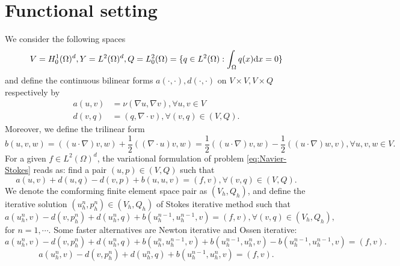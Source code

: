 \section{Functional setting}
We consider the following spaces
\[V=H_0^1(\Omega)^d,Y=L^2(\Omega)^d,Q=L^2_0(\Omega)=\{q\in L^2(\Omega):\int_\Omega q(x)\mathrm{d} x=0\}\]
and define the continuous bilinear forms $a(\cdot,\cdot),d(\cdot,\cdot)$ on $V\times V,V\times Q$ 
respectively by
\[
  \begin{split}
    a(u,v)&=\nu(\nabla u,\nabla v),\forall u,v\in V\\
    d(v,q)&=(q,\nabla\cdot v),\forall (v,q)\in(V,Q).
  \end{split}
  \]
Moreover, we define the trilinear form
\[b(u,v,w)=((u\cdot\nabla)v,w)+\frac{1}{2}((\nabla\cdot u)v,w)=
\frac{1}{2}((u\cdot\nabla)v,w)-\frac{1}{2}((u\cdot\nabla)w,v),\forall u,v,w\in V.\]
For a given $f\in L^2(\Omega)^d$, the variational formulation of problem \eqref{eq:Navier-Stokes} reads as: 
find a pair $(u,p)\in(V,Q)$ such that 
\begin{equation}\label{eq:variational-form}
  a(u,v)+d(u,q)-d(v,p)+b(u,u,v)=(f,v),\forall (v,q)\in(V,Q).
\end{equation}
We denote the comforming finite element space pair as $(V_h,Q_h)$, 
and define the iterative solution $(u^n_h,p^n_h)\in(V_h,Q_h)$ of Stokes iterative method such that
\begin{equation}\label{eq:discrete-variational}
  a(u_h^n,v)-d(v,p^n_h)+d(u_h^n,q)+b(u_h^{n-1},u_h^{n-1},v)=(f,v),\forall (v,q)\in(V_h,Q_h),
\end{equation}
for $n=1,\cdots$. Some faster alternatives are Newton iterative and Ossen iterative:
\begin{equation}\label{eq:newton-variational}
  a(u_h^n,v)-d(v,p^n_h)+d(u_h^n,q)+b(u_h^{n},u_h^{n-1},v)+b(u_h^{n-1},u_h^{n},v)-b(u_h^{n-1},u_h^{n-1},v)=(f,v).
\end{equation}
\begin{equation}\label{eq:oseen-variation}
  a(u_h^n,v)-d(v,p^n_h)+d(u_h^n,q)+b(u_h^{n-1},u_h^{n},v)=(f,v).
\end{equation}
